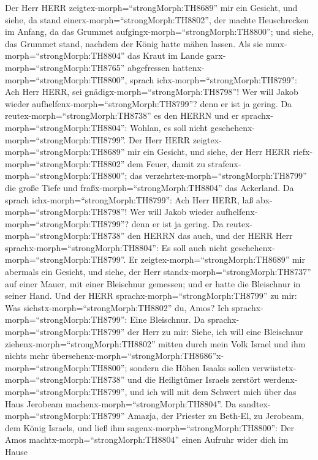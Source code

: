  Der Herr HERR zeigtex-morph=``strongMorph:TH8689'' mir ein
Gesicht, und siehe, da stand einerx-morph=``strongMorph:TH8802'', der
machte Heuschrecken im Anfang, da das Grummet
aufgingx-morph=``strongMorph:TH8800''; und siehe, das Grummet stand,
nachdem der König hatte mähen lassen.  Als sie
nunx-morph=``strongMorph:TH8804'' das Kraut im Lande
garx-morph=``strongMorph:TH8765'' abgefressen
hattenx-morph=``strongMorph:TH8800'', sprach
ichx-morph=``strongMorph:TH8799'': Ach Herr HERR, sei
gnädigx-morph=``strongMorph:TH8798''! Wer will Jakob wieder
aufhelfenx-morph=``strongMorph:TH8799''? denn er ist ja gering.
 Da reutex-morph=``strongMorph:TH8738'' es den HERRN und er
sprachx-morph=``strongMorph:TH8804'': Wohlan, es soll nicht
geschehenx-morph=``strongMorph:TH8799''.  Der Herr HERR
zeigtex-morph=``strongMorph:TH8689'' mir ein Gesicht, und siehe, der
Herr HERR riefx-morph=``strongMorph:TH8802'' dem Feuer, damit zu
strafenx-morph=``strongMorph:TH8800''; das
verzehrtex-morph=``strongMorph:TH8799'' die große Tiefe und
fraßx-morph=``strongMorph:TH8804'' das Ackerland.  Da sprach
ichx-morph=``strongMorph:TH8799'': Ach Herr HERR, laß
abx-morph=``strongMorph:TH8798''! Wer will Jakob wieder
aufhelfenx-morph=``strongMorph:TH8799''? denn er ist ja gering.
 Da reutex-morph=``strongMorph:TH8738'' den HERRN das auch,
und der HERR Herr sprachx-morph=``strongMorph:TH8804'': Es soll auch
nicht geschehenx-morph=``strongMorph:TH8799''.  Er
zeigtex-morph=``strongMorph:TH8689'' mir abermals ein Gesicht, und
siehe, der Herr standx-morph=``strongMorph:TH8737'' auf einer Mauer, mit
einer Bleischnur gemessen; und er hatte die Bleischnur in seiner Hand.
 Und der HERR sprachx-morph=``strongMorph:TH8799'' zu mir:
Was siehstx-morph=``strongMorph:TH8802'' du, Amos? Ich
sprachx-morph=``strongMorph:TH8799'': Eine Bleischnur. Da
sprachx-morph=``strongMorph:TH8799'' der Herr zu mir: Siehe, ich will
eine Bleischnur ziehenx-morph=``strongMorph:TH8802'' mitten durch mein
Volk Israel und ihm nichts mehr
übersehenx-morph=``strongMorph:TH8686''x-morph=``strongMorph:TH8800'';
 sondern die Höhen Isaaks sollen
verwüstetx-morph=``strongMorph:TH8738'' und die Heiligtümer Israels
zerstört werdenx-morph=``strongMorph:TH8799'', und ich will mit dem
Schwert mich über das Haus Jerobeam
machenx-morph=``strongMorph:TH8804''.  Da
sandtex-morph=``strongMorph:TH8799'' Amazja, der Priester zu Beth-El, zu
Jerobeam, dem König Israels, und ließ ihm
sagenx-morph=``strongMorph:TH8800'': Der Amos
machtx-morph=``strongMorph:TH8804'' einen Aufruhr wider dich im Hause
